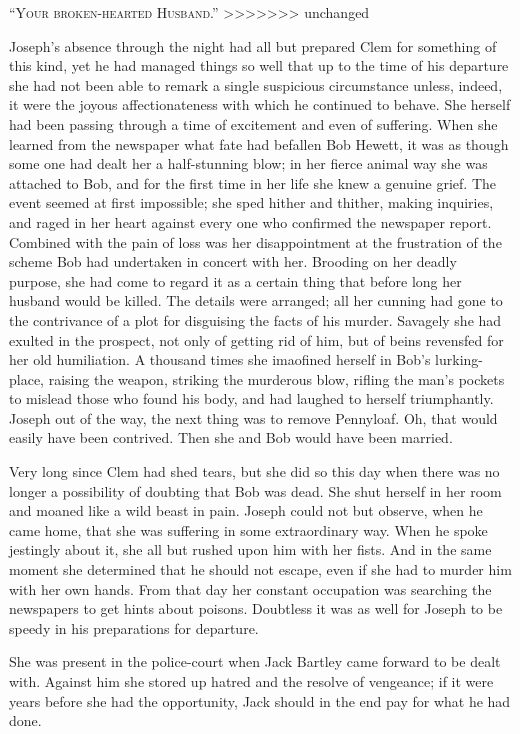 \textsc{``Your broken-hearted Husband.''}{⁠}
>>>>>>> unchanged

Joseph's absence through the night had all but prepared Clem for
something of this kind, yet he had managed things so well that up to the
time of his departure she had not been able to remark a single
suspicious circumstance {}unless, indeed, it were the joyous
affectionateness with which he continued to behave. She herself had been
passing through a time of excitement and even of suffering. When she
learned from the newspaper what fate had befallen Bob Hewett, it was as
though some one had dealt her a half-stunning blow; in her fierce animal
way she was attached to Bob, and for the first time in her life she knew
a genuine grief. The event seemed at first impossible; she sped hither
and thither, making inquiries, and raged in her heart against every one
who confirmed the newspaper report. Combined with the pain of loss was
her disappointment at the frustration of the scheme Bob had undertaken
in concert with her. Brooding on her deadly purpose, she had come to
regard it as a certain thing that before long her husband would be
killed. The details were arranged; all her cunning had gone to the
contrivance of a plot for disguising the facts of his murder. Savagely
she had exulted in the prospect, not only of getting rid of him, but of
beins revensfed for her old humiliation. A thousand times she imaofined
herself in Bob's lurking-place, raising the weapon, {}striking the
murderous blow, rifling the man's pockets to mislead those who found his
body, and had laughed to herself triumphantly. Joseph out of the way,
the next thing was to remove Pennyloaf. Oh, that would easily have been
contrived. Then she and Bob would have been married.

Very long since Clem had shed tears, but she did so this day when there
was no longer a possibility of doubting that Bob was dead. She shut
herself in her room and moaned like a wild beast in pain. Joseph could
not but observe, when he came home, that she was suffering in some
extraordinary way. When he spoke jestingly about it, she all but rushed
upon him with her fists. And in the same moment she determined that he
should not escape, even if she had to murder him with her own hands.
From that day her constant occupation was searching the newspapers to
get hints about poisons. Doubtless it was as well for Joseph to be
speedy in his preparations for departure.

She was present in the police-court when Jack Bartley came forward to be
dealt with. Against him she stored up hatred and the {}resolve of
vengeance; if it were years before she had the opportunity, Jack should
in the end pay for what he had done.

